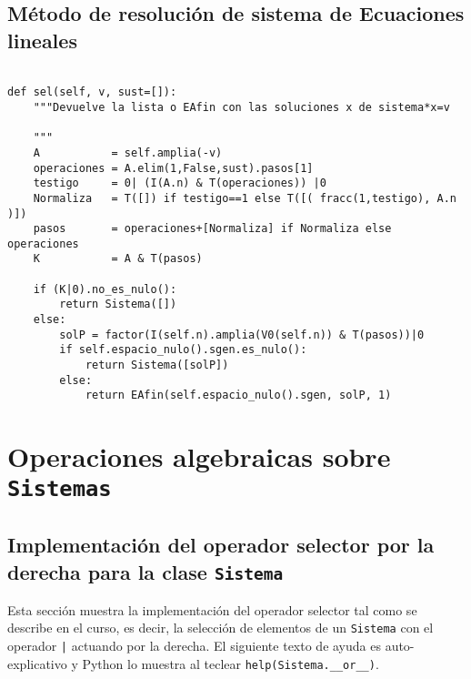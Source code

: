 \documentclass[11pt]{report}
\begin{document}
\subsection{Método de resolución de sistema de Ecuaciones lineales}
\label{sec:orgf723497}
\begin{verbatim}

def sel(self, v, sust=[]):
    """Devuelve la lista o EAfin con las soluciones x de sistema*x=v

    """
    A           = self.amplia(-v)
    operaciones = A.elim(1,False,sust).pasos[1]
    testigo     = 0| (I(A.n) & T(operaciones)) |0
    Normaliza   = T([]) if testigo==1 else T([( fracc(1,testigo), A.n )])
    pasos       = operaciones+[Normaliza] if Normaliza else operaciones
    K           = A & T(pasos)
    
    if (K|0).no_es_nulo():
        return Sistema([])
    else:
        solP = factor(I(self.n).amplia(V0(self.n)) & T(pasos))|0
        if self.espacio_nulo().sgen.es_nulo():
            return Sistema([solP])
        else:
            return EAfin(self.espacio_nulo().sgen, solP, 1)

\end{verbatim}

\section{Operaciones algebraicas sobre \texttt{Sistemas}}
\label{sec:orgd77f10a}

\subsection{Implementación del operador selector por la derecha para la clase \texttt{Sistema}}
\label{sec:org7aef252}

Esta sección muestra la implementación del operador selector tal como
se describe en el curso, es decir, la selección de elementos de un
\texttt{Sistema} con el operador \texttt{|} actuando por la derecha. El siguiente
texto de ayuda es auto-explicativo y Python lo muestra al teclear
\texttt{help(Sistema.\_\_or\_\_)}.
\end{document}
